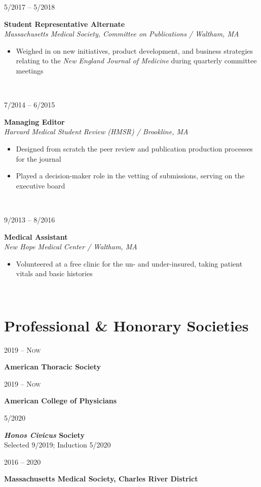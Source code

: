 \documentclass{book}
\newcommand\colleft{.20}
\newcommand\colright{.75}
\newcommand{\entryfour}[4]
	{
		\begin{minipage}[t]{\colleft\textwidth}
		\hfill \textsc{#1}
		\end{minipage}
		\hfill\vline\hfill
		\begin{minipage}[t]{\colright\textwidth}
		{\bf#2}\\
		\textit{#3}
		\footnotesize{#4}
		\end{minipage}\\
		\entryvspace
	}%
\newcommand{\entrythree}[3]
{
	\begin{minipage}[t]{\colleft\textwidth}
		\hfill \textsc{#1}
	\end{minipage}
	\hfill\vline\hfill
	\begin{minipage}[t]{\colright\textwidth}
		{\bf#2}\\
		\footnotesize{#3}
	\end{minipage}
	\entryvspace
}%
\newcommand{\entrytwo}[2]
{
	\begin{minipage}[t]{\colleft\textwidth}
		\hfill \textsc{#1}
	\end{minipage}
	\hfill\vline\hfill
	\begin{minipage}[t]{\colright\textwidth}
		{\bf#2}
	\end{minipage}
	\entryvspace
}%
\newcommand{\entryvspace}{\vspace{0.5em}}
\begin{document}
	\entryfour{5/2017 -- 5/2018}{Student Representative Alternate}{Massachusetts Medical Society, Committee on Publications / Waltham, MA}{%
	\begin{itemize}
		\item Weighed in on new initiatives, product development, and business strategies relating to the \emph{New England Journal of Medicine} during quarterly committee meetings
	\end{itemize}
}

	\entryfour{7/2014 -- 6/2015}{Managing Editor}{Harvard Medical Student Review (HMSR) / Brookline, MA}{%
	\begin{itemize}
		\item Designed from scratch the peer review and publication production processes for the journal
		\item Played a decision-maker role in the vetting of submissions, serving on the executive board
	\end{itemize}
	}

	\entryfour{9/2013 -- 8/2016}{Medical Assistant}{New Hope Medical Center / Waltham, MA}{%
	\begin{itemize}
		\item Volunteered at a free clinic for the un- and under-insured, taking patient vitals and basic histories
	\end{itemize}
	}
	\section*{Professional \& Honorary Societies}
		\entrytwo{2019 -- Now}{American Thoracic Society}
		
		\entrytwo{2019 -- Now}{American College of Physicians}
		
		\entrythree{5/2020}{\textit{Honos Civicus} Society}{Selected 9/2019; Induction 5/2020}
		
		\entrytwo{2016 -- 2020}{Massachusetts Medical Society, Charles River District}
\end{document}
